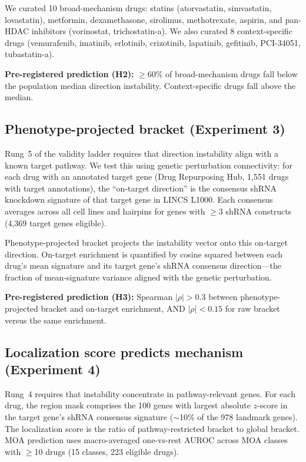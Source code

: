 \documentclass{article}
\begin{document}
We curated 10 broad-mechanism drugs: statins (atorvastatin, simvastatin,
lovastatin), metformin, dexamethasone, sirolimus, methotrexate, aspirin,
and pan-HDAC inhibitors (vorinostat, trichostatin-a). We also curated 8
context-specific drugs (vemurafenib, imatinib, erlotinib, crizotinib,
lapatinib, gefitinib, PCI-34051, tubastatin-a).

\textbf{Pre-registered prediction (H2):} $\geq$60\% of broad-mechanism drugs
fall below the population median direction instability. Context-specific
drugs fall above the median.

\subsection{Phenotype-projected bracket (Experiment 3)}

Rung~5 of the validity ladder requires that direction instability align with
a known target pathway. We test this using genetic perturbation connectivity:
for each drug with an annotated target gene (Drug Repurposing Hub,
1{,}551 drugs with target annotations), the ``on-target direction'' is the
consensus shRNA knockdown signature of that target gene in LINCS L1000.
Each consensus averages across all cell lines and hairpins for genes with
$\geq$3 shRNA constructs (4{,}369 target genes eligible).

Phenotype-projected bracket projects the instability vector onto this
on-target direction. On-target enrichment is quantified by cosine squared
between each drug's mean signature and its target gene's shRNA consensus
direction---the fraction of mean-signature variance aligned with the
genetic perturbation.

\textbf{Pre-registered prediction (H3):} Spearman $|\rho| > 0.3$ between
phenotype-projected bracket and on-target enrichment, AND $|\rho| < 0.15$
for raw bracket versus the same enrichment.

\subsection{Localization score predicts mechanism (Experiment 4)}

Rung~4 requires that instability concentrate in pathway-relevant genes.
For each drug, the region mask comprises the 100 genes with largest absolute
$z$-score in the target gene's shRNA consensus signature ($\sim$10\% of the
978 landmark genes). The localization score is the ratio of pathway-restricted
bracket to global bracket. MOA prediction uses macro-averaged one-vs-rest
AUROC across MOA classes with $\geq$10 drugs (15 classes, 223 eligible drugs).
\end{document}
